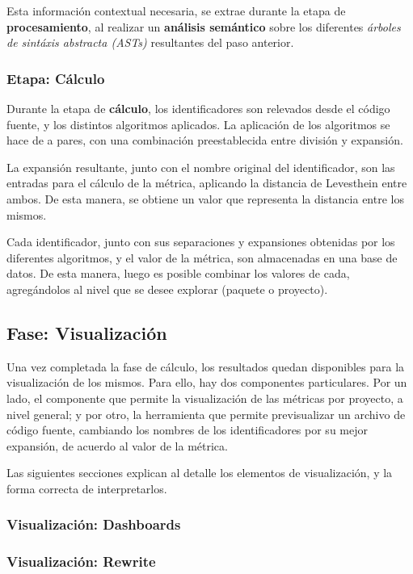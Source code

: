 Esta información contextual necesaria, se extrae durante la etapa de \textbf{procesamiento},
al realizar un \textbf{análisis semántico} sobre los diferentes \textit{árboles de sintáxis abstracta (ASTs)} 
resultantes del paso anterior.

\subsubsection{Etapa: Cálculo}

Durante la etapa de \textbf{cálculo}, los identificadores son relevados desde el código fuente,
y los distintos algoritmos aplicados.
La aplicación de los algoritmos se hace de a pares, con una combinación preestablecida
entre división y expansión.

La expansión resultante, junto con el nombre original del identificador, son las
entradas para el cálculo de la métrica, aplicando la distancia de Levesthein
entre ambos.
De esta manera, se obtiene un valor que representa la distancia entre los mismos.

Cada identificador, junto con sus separaciones y expansiones obtenidas por los diferentes
algoritmos, y el valor de la métrica, son almacenadas en una base de datos.
De esta manera, luego es posible combinar los valores de cada, agregándolos al nivel
que se desee explorar (paquete o proyecto).

\subsection{Fase: Visualización}

Una vez completada la fase de cálculo, los resultados quedan disponibles para la
visualización de los mismos.
Para ello, hay dos componentes particulares.
Por un lado, el componente que permite la visualización de las métricas por proyecto,
a nivel general; y por otro, la herramienta que permite previsualizar un archivo
de código fuente, cambiando los nombres de los identificadores por su mejor expansión,
de acuerdo al valor de la métrica.

Las siguientes secciones explican al detalle los elementos de visualización, y
la forma correcta de interpretarlos.

\subsubsection{Visualización: Dashboards}



\subsubsection{Visualización: Rewrite}

